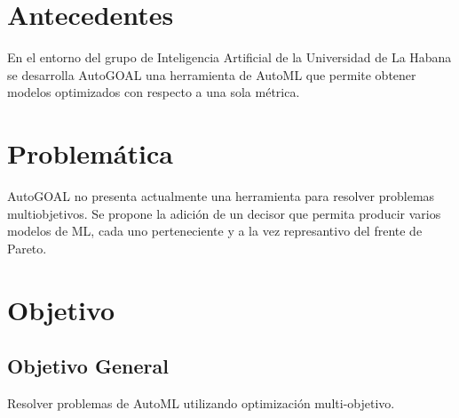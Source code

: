 





\section*{Antecedentes}
En el entorno del grupo de Inteligencia Artificial de la Universidad de La Habana se desarrolla AutoGOAL una herramienta de AutoML que permite obtener modelos optimizados con respecto a una sola m\'etrica.

\section*{Problem\'atica}
AutoGOAL no presenta actualmente una herramienta para resolver problemas multiobjetivos. Se propone la adici\'on de un decisor que permita producir varios modelos de ML, cada uno perteneciente y a la vez represantivo del frente de Pareto.


\section*{Objetivo}
\subsection*{Objetivo General}
Resolver problemas de AutoML utilizando optimizaci\'on multi-objetivo.
